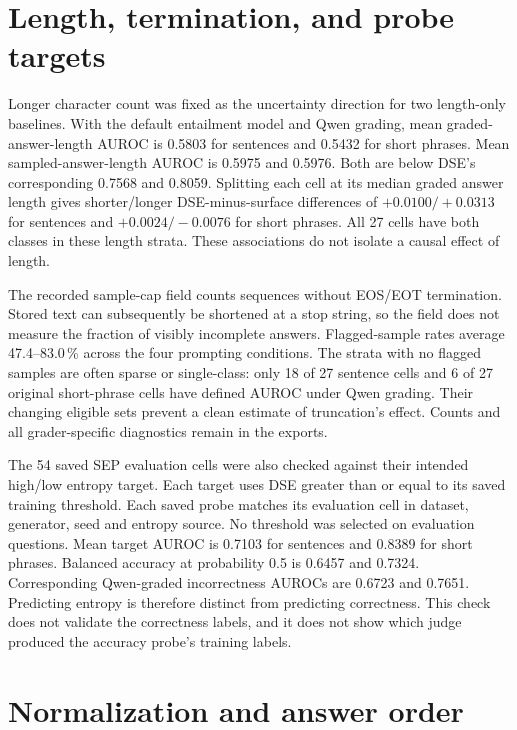 \section{Length, termination, and probe targets}

Longer character count was fixed as the uncertainty direction for two
length-only baselines. With the default entailment model and Qwen grading,
mean graded-answer-length AUROC is 0.5803 for sentences and 0.5432 for short
phrases. Mean sampled-answer-length AUROC is 0.5975 and 0.5976. Both are below
DSE's corresponding 0.7568 and 0.8059. Splitting each cell at its median graded
answer length gives shorter/longer DSE-minus-surface differences of
$+0.0100/+0.0313$ for sentences and $+0.0024/-0.0076$ for short phrases.
All 27 cells have both classes in these length strata. These associations do
not isolate a causal effect of length.

The recorded sample-cap field counts sequences without EOS/EOT termination.
Stored text can subsequently be shortened at a stop string, so the field does
not measure the fraction of visibly incomplete answers. Flagged-sample rates
average 47.4--83.0\,\% across the four prompting conditions. The strata with
no flagged samples are often sparse or single-class: only 18 of 27 sentence
cells and 6 of 27 original short-phrase cells have defined AUROC under Qwen
grading. Their changing eligible sets prevent a clean estimate of truncation's
effect. Counts and all grader-specific diagnostics remain in the exports.

The 54 saved SEP evaluation cells were also checked against their intended
high/low entropy target. Each target uses DSE greater than or equal to its
saved training threshold. Each saved probe matches its evaluation cell in
dataset, generator, seed and entropy source.
No threshold was selected on evaluation questions. Mean target AUROC is
0.7103 for sentences and 0.8389 for short phrases. Balanced accuracy at
probability 0.5 is 0.6457 and 0.7324. Corresponding Qwen-graded incorrectness
AUROCs are 0.6723 and 0.7651. Predicting entropy is therefore distinct from
predicting correctness. This check does not validate the correctness labels,
and it does not show which judge produced the accuracy probe's training labels.

\section{Normalization and answer order}

